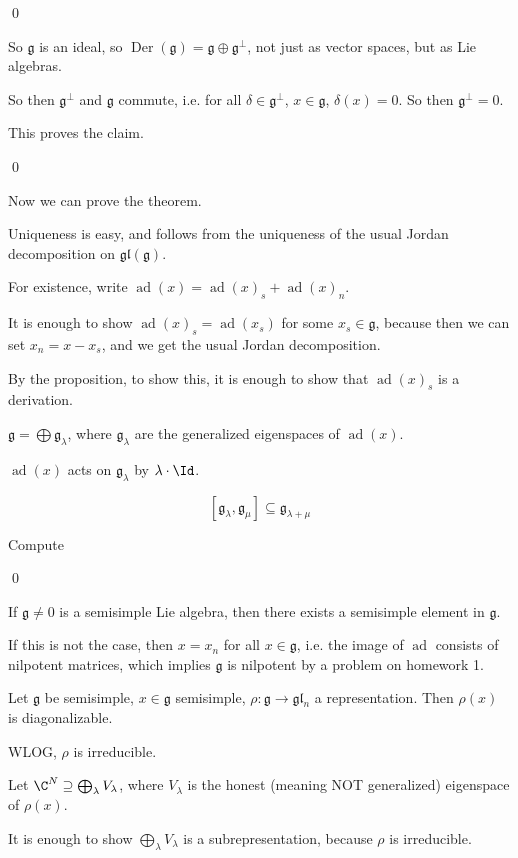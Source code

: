\documentclass[x11names,reqno,14pt]{extarticle}
\newcommand{\mk}[1]{\mathfrak{#1}}
\newcommand{\g}{\mk{g}}
\DeclareMathOperator{\ad}{ad}
\DeclareMathOperator{\Der}{Der}
\newcommand{\gl}{\mk{g}\mk{l}}
\begin{document}
\qed

So $\g$ is an ideal, so $\Der(\g) = \g \oplus \g^\perp$, not just as vector spaces, but as Lie algebras. 

So then $\g^\perp$ and $\g$ commute, i.e. for all $\delta \in \g^\perp$, $x \in \g$, $\delta(x) = 0$. So then $\g^\perp = 0$.

This proves the claim. 

\qed

Now we can prove the theorem. 

\proof

Uniqueness is easy, and follows from the uniqueness of the usual Jordan decomposition on $\gl(\g)$. 

For existence, write $\ad(x) = \ad(x)_s + \ad(x)_n$. 

It is enough to show $\ad(x)_s = \ad(x_s)$ for some $x_s \in \g$, because then we can set $x_n = x - x_s$, and we get the usual Jordan decomposition. 

By the proposition, to show this, it is enough to show that $\ad(x)_s$ is a derivation. 

$\g = \bigoplus \g_\lambda$, where $\g_\lambda$ are the generalized eigenspaces of $\ad(x)$. 

$\ad(x)$ acts on $\g_\lambda$ by $\lambda\cdot \Id$. 

\claim
\[
[\g_\lambda,\g_\mu]\subseteq\g_{\lambda+\mu}
\]

\proof

Compute

\qed

\cor

If $\g \neq 0$ is a semisimple Lie algebra, then there exists a semisimple element in $\g$. 

\proof

If this is not the case, then $x = x_n$ for all $x \in \g$, i.e. the image of $\ad$ consists of nilpotent matrices, which implies $\g$ is nilpotent by a problem on homework 1.

\prop

Let $\g$ be semisimple, $x \in \g$ semisimple, $\rho:\g\to\gl_n$ a representation. Then $\rho(x)$ is diagonalizable.  

\proof

WLOG, $\rho$ is irreducible. 

Let $\C^N \supseteq \bigoplus_\lambda V_\lambda$, where $V_\lambda$ is the honest (meaning NOT generalized) eigenspace of $\rho(x)$. 

It is enough to show $\bigoplus_\lambda V_\lambda$ is a subrepresentation, because $\rho$ is irreducible. 
\end{document}

